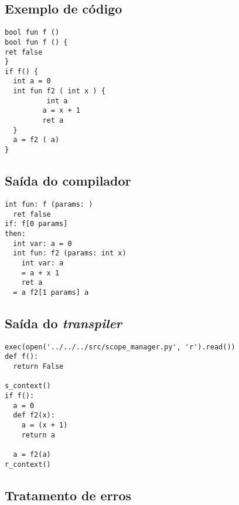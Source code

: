\documentclass{sftex/sftex}
\begin{document}
\subsection{Exemplo de código}

\begin{verbatim}
bool fun f ()
bool fun f () {
ret false
}
if f() {
  int a = 0
  int fun f2 ( int x ) {
          int a
         a = x + 1
         ret a
  }
  a = f2 ( a)
}
\end{verbatim}

\subsection{Saída do compilador}

\begin{verbatim}
int fun: f (params: )
  ret false
if: f[0 params]
then:
  int var: a = 0
  int fun: f2 (params: int x)
    int var: a
    = a + x 1
    ret a
  = a f2[1 params] a
\end{verbatim}

\subsection{Saída do \emph{transpiler}}

\begin{verbatim}
exec(open('../../../src/scope_manager.py', 'r').read())
def f():
  return False

s_context()
if f():
  a = 0
  def f2(x):
    a = (x + 1)
    return a

  a = f2(a)
r_context()
\end{verbatim}

\subsection{Tratamento de erros}
\end{document}
